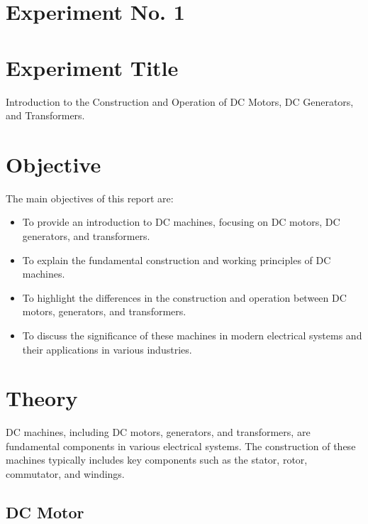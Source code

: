 \documentclass[a4paper,12pt]{article}
\begin{document}
	
	
	
	
	
	\newpage
	
	\section{Experiment No. 1}
	
	\section{Experiment Title }
	Introduction to the Construction and Operation of DC Motors, DC Generators, and Transformers.
	
	
	\section{Objective}
	The main objectives of this report are:
	\begin{itemize}
		\item To provide an introduction to DC machines, focusing on DC motors, DC generators, and transformers.
		\item To explain the fundamental construction and working principles of DC machines.
		\item To highlight the differences in the construction and operation between DC motors, generators, and transformers.
		\item To discuss the significance of these machines in modern electrical systems and their applications in various industries.
	\end{itemize}
	
	
	\section{Theory}
	DC machines, including DC motors, generators, and transformers, are fundamental components in various electrical systems. The construction of these machines typically includes key components such as the stator, rotor, commutator, and windings.
	
	\subsection{DC Motor}
	
\end{document}
